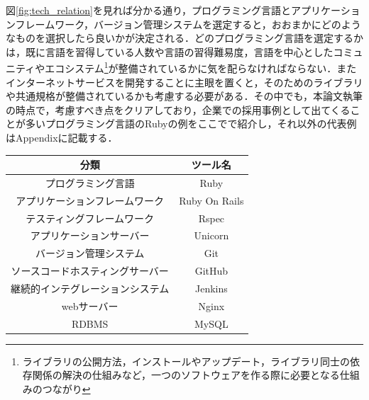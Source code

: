 図\ref{fig:tech_relation}を見れば分かる通り，プログラミング言語とアプリケーションフレームワーク，バージョン管理システムを選定すると，おおまかにどのようなものを選択したら良いかが決定される．どのプログラミング言語を選定するかは，既に言語を習得している人数や言語の習得難易度，言語を中心としたコミュニティやエコシステム\footnote{ライブラリの公開方法，インストールやアップデート，ライブラリ同士の依存関係の解決の仕組みなど，一つのソフトウェアを作る際に必要となる仕組みのつながり}が整備されているかに気を配らなければならない．またインターネットサービスを開発することに主眼を置くと，そのためのライブラリや共通規格が整備されているかも考慮する必要がある．その中でも，本論文執筆の時点で，考慮すべき点をクリアしており，企業での採用事例として出てくることが多いプログラミング言語のRubyの例をここでで紹介し，それ以外の代表例はAppendixに記載する．

\begin{table}[ht]
  \begin{center}
    \begin{tabular}{|c|c|}
      \hline
      分類 & ツール名 \\
      \hline
      プログラミング言語 & Ruby \\
      \hline
      アプリケーションフレームワーク& Ruby On Rails\\
      \hline
      テスティングフレームワーク & Rspec \\
      \hline
      アプリケーションサーバー & Unicorn \\
      \hline
      バージョン管理システム & Git \\
      \hline
      ソースコードホスティングサーバー & GitHub \\
      \hline
      継続的インテグレーションシステム & Jenkins \\
      \hline
      webサーバー & Nginx \\
      \hline
      RDBMS & MySQL \\
      \hline
    \end{tabular}
  \end{center}
\end{table}
